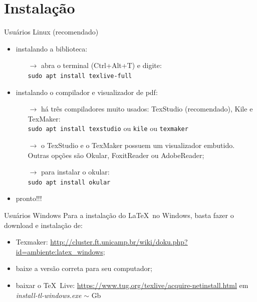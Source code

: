 \documentclass[c]{beamer}
\begin{document}
{

\section{Instalação}

\begin{frame}{\sc Usuários Linux (recomendado)}
\begin{itemize}
	\setlength\itemsep{0.2cm}
	\item instalando a biblioteca:
	\begin{itemize}
	\item[$\to$] abra o terminal (Ctrl+Alt+T) e digite:\\
	 \texttt{sudo apt install texlive-full}
\end{itemize}
	\item instalando o compilador e visualizador de pdf:
	\begin{itemize}
		\item[$\to$] há três compiladores muito usados:  TexStudio (recomendado), Kile e  TexMaker:\\
		\texttt{sudo apt install texstudio} ou \texttt{kile} ou \texttt{texmaker}
		\item[$\to$] o TexStudio e o TexMaker possuem um visualizador embutido. Outras opções são Okular, FoxitReader ou AdobeReader;
		\item[$\to$] para instalar o okular:\\
		\texttt{sudo apt install okular}
	\end{itemize}
	\item pronto!!!
\end{itemize}
\end{frame}

\begin{frame}[fragile]{\sc Usuários Windows}
	Para a instalação do \LaTeX\ no Windows, basta fazer o download e instalação de:
	\begin{itemize}
		\setlength\itemsep{0.3cm}
		\item Texmaker:  \url{http://cluster.ft.unicamp.br/wiki/doku.php?id=ambiente:latex_windows};
		\item baixe a versão correta para seu computador;
		\item baixar o \TeX\ Live: \url{https://www.tug.org/texlive/acquire-netinstall.html} em \emph{install-tl-windows.exe} \quad $\sim$ \quad 4.4 Gb
	\end{itemize}
\end{frame}

}
\end{document}
